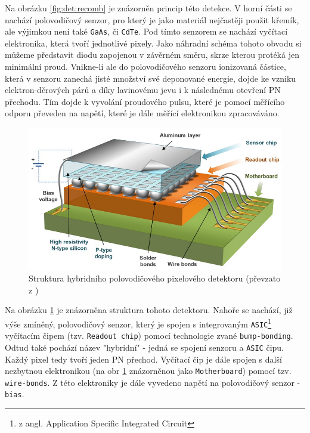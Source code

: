 Na obrázku \ref{fig:det:recomb} je znázorněn princip této detekce. V horní části se nachází polovodičový senzor, pro který je jako materiál nejčastěji použit křemík, ale výjimkou není také \texttt{GaAs}, či \texttt{CdTe}. Pod tímto senzorem se nachází vyčítací elektronika, která tvoří jednotlivé pixely. Jako náhradní schéma tohoto obvodu si můžeme představit diodu zapojenou v závěrném směru, skrze kterou protéká jen minimální proud. Vnikne-li ale do polovodičového senzoru ionizovaná částice, která v senzoru zanechá jisté množství své deponované energie, dojde ke vzniku elektron-děrových párů a díky lavinovému jevu i k následnému otevření PN přechodu. Tím dojde k vyvolání proudového pulsu, které je pomocí měřícího odporu převeden na napětí, které je dále měřící elektronikou zpracováváno.

\begin{figure}[th]
	\begin{center}
		\includegraphics[width=12cm]{figures/det_chip.png}
		\caption{Struktura hybridního polovodičového pixelového detektoru (převzato z \cite{PlatkevicDisertace})}
		\label{fig:det:chip}
	\end{center}
\end{figure}

Na obrázku \ref{fig:det:chip} je znázorněna struktura tohoto detektoru. Nahoře se nachází, již výše zmíněný, polovodičový senzor, který je spojen s integrovaným \texttt{ASIC}\footnote{z angl. Application Specific Integrated Circuit} vyčítacím čipem (tzv. \texttt{Readout chip}) pomocí technologie zvané \texttt{bump-bonding}. Odtud také pochází název "hybridní" - jedná se spojení senzoru a \texttt{ASIC} čipu. Každý pixel tedy tvoří jeden PN přechod. Vyčítací čip je dále spojen s další nezbytnou elektronikou (na obr \ref{fig:det:chip} znázorněnou jako \texttt{Motherboard}) pomocí tzv. \texttt{wire-bonds}. Z této elektroniky je dále vyvedeno napětí na polovodičový senzor - \texttt{bias}.

